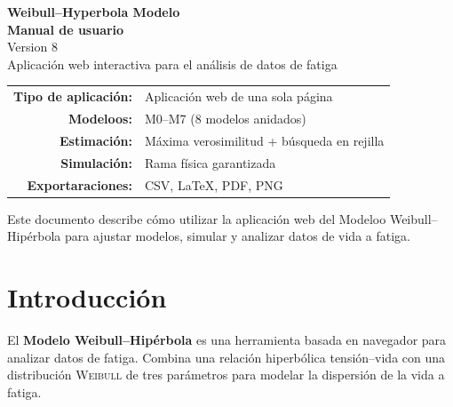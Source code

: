\documentclass[11pt,a4paper]{article}
\newcommand{\Weibull}{\textsc{Weibull}}
\begin{document}
\begin{titlepage}
\centering
\vspace*{3cm}

{\Huge\bfseries\color{accent} Weibull--Hyperbola Modelo}\\[0.4cm]
{\LARGE\bfseries Manual de usuario}\\[1.5cm]

{\large Version 8}\\[0.3cm]
{\large Aplicación web interactiva para el análisis de datos de fatiga}\\[3cm]

\begin{tabular}{rl}
\textbf{Tipo de aplicación:} & Aplicación web de una sola página \\
\textbf{Modeloos:} & M0--M7 (8 modelos anidados) \\
\textbf{Estimación:} & Máxima verosimilitud + búsqueda en rejilla \\
\textbf{Simulación:} & Rama física garantizada \\
\textbf{Exportaraciones:} & CSV, LaTeX, PDF, PNG \\
\end{tabular}

\vfill

{\small Este documento describe cómo utilizar la aplicación web del Modeloo Weibull--Hipérbola para ajustar modelos, simular y analizar datos de vida a fatiga.}

\end{titlepage}

\tableofcontents
\newpage

\section{Introducción}

El \textbf{Modelo Weibull--Hipérbola} es una herramienta basada en navegador para analizar datos de fatiga. Combina una relación hiperbólica tensión--vida con una distribución \Weibull{} de tres parámetros para modelar la dispersión de la vida a fatiga.
\end{document}
